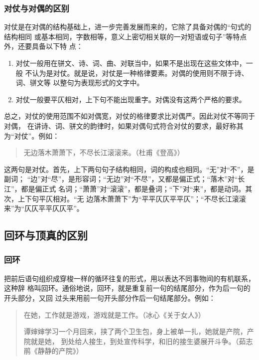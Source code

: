 \documentclass[final,oneside]{ctexbook}
\newenvironment{equotation}{\begin{quotation}\kaishu}{\end{quotation}}
\begin{document}
\subsubsection{对仗与对偶的区别}

对仗是在对偶的结构基础上，进一步完善发展而来的，它除了具备对偶的“句式的结构相同
或基本相同，字数相等，意义上密切相关联的一对短语或句子”等特点外，还要具备以下特
点：

\begin{enumerate}
  \item 对仗一般用在骈文、诗、词、曲、对联当中，如果不是出现在这些文体中，一般
    不认为是对仗。就是说，对仗是一种格律要素。对偶的使用则不限于诗、词、骈文等
    以整句为表现形式的文字中。
  \item 对仗一般要平仄相对，上下句不能出现重字。对偶没有这两个严格的要求。
\end{enumerate}

总之，对仗的使用范围不如对偶宽，对仗的格律要求比对偶严。因此对仗不等同于对偶，
在讲诗、词、骈文的韵律时，如果对偶句式符合对仗的要求，最好称其为“对仗”。例如：
\begin{equotation}
  无边落木萧萧下，不尽长江滚滚来。（杜甫《登高》）
\end{equotation}
这两句是对仗。首先，上下两句句子结构相同，词的构成也相同。“无”对“不”，是副词；
“边”对“尽”，是形容词；“无边”对“不尽”，又都是偏正式；“落木”对“长江”，都是偏正式
名词；“萧萧”对“滚滚”，都是叠词；“下”对“来”，都是动词。其次，上下句平仄相对。“无
边落木萧萧下”为“平平仄仄平平仄”；“不尽长江滚滚来”为“仄仄平平仄仄平”。

\subsection{回环与顶真的区别}

\subsubsection{回环}

把前后语句组织成穿梭一样的循环往复的形式，用以表达不同事物间的有机联系，这种辞
格叫回环。通俗地说，回环，就是重复前一句的结尾部分，作为后一句的开头部分，又回
过头来用前一句开头部分作后一句结尾部分。例如：
\begin{equotation}
  在她，工作就是游戏，游戏就是工作。（冰心《关于女人》）

  谭婶婶学习一个月回来，挟了两个卫生包，身上被单一扎，她就是产院，产院就是她，
  到处给人接生，到处宣传科学，和旧的接生婆展开斗争。（茹志鹃《静静的产院》）
\end{equotation}
\end{document}
